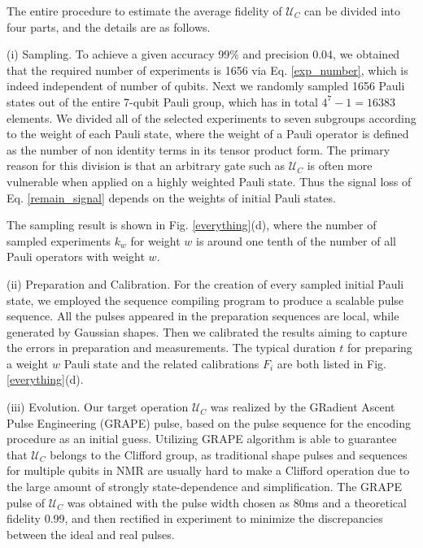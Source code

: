 \documentclass[prl,twocolumn,showpacs]{revtex4-1}
\begin{document}
The entire procedure to estimate the average fidelity of $\mathcal{U}_{C}$ can be divided into four parts, and the details are as follows.

(i) Sampling. To achieve a given accuracy 99\% and precision 0.04, we obtained that the required number of experiments is 1656 via Eq. \ref{exp_number}, which is indeed independent of number of qubits. Next we randomly sampled 1656 Pauli states out of the entire 7-qubit Pauli group, which has in total $4^7-1=16383$ elements. We divided all of the selected experiments to seven subgroups according to the weight of each Pauli state, where the weight of a Pauli operator is defined as the number of non identity terms in its tensor product form. The primary reason for this division is that an arbitrary gate such as $\mathcal{U}_{C}$ is often more vulnerable when applied on a highly weighted Pauli state. Thus the signal loss of Eq. \ref{remain_signal} depends on the weights of initial Pauli states. 

The sampling result is shown in Fig. \ref{everything}(d), where the number of sampled experiments $k_w$ for weight $w$ is around one tenth of the number of all Pauli operators with weight $w$. 

(ii) Preparation and Calibration. For the creation of every sampled initial Pauli state, we employed the sequence compiling program\cite{Ryan2008} to produce a scalable pulse sequence. All the pulses appeared in the preparation sequences are local, while generated by Gaussian shapes. Then we calibrated the results aiming to capture the errors in preparation and measurements. The typical duration $t$ for preparing a weight $w$ Pauli state and the related calibrations $F_i$ are both listed in Fig. \ref{everything}(d).

(iii) Evolution. Our target operation $\mathcal{U}_{C}$ was realized by the GRadient Ascent Pulse Engineering (GRAPE) pulse\cite{Khaneja2005}, based on the pulse sequence for the encoding procedure as an initial guess. Utilizing GRAPE algorithm is able to guarantee that $\mathcal{U}_{C}$ belongs to the Clifford group, as traditional shape pulses and sequences for multiple qubits in NMR are usually hard to make a Clifford operation due to the large amount of strongly state-dependence and simplification. The GRAPE pulse of $\mathcal{U}_{C}$ was obtained with the pulse width chosen as 80ms and a theoretical fidelity 0.99, and then rectified in experiment to minimize the discrepancies between the ideal and real pulses\cite{Weinstein2004}.
\end{document}
